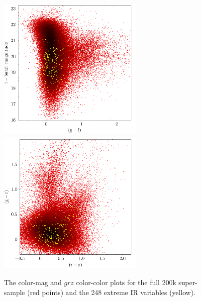 \documentclass{emulateapj}
\begin{document}
    \begin{figure}
      \includegraphics[width=7.00cm, height=7.00cm, trim=0.0cm 0.0cm 0.0cm 0.0cm, clip]
      {../color_color/colormag_gr_imag_topcat.png}
      \includegraphics[width=7.00cm, height=7.00cm, trim=0.0cm 0.0cm 0.0cm 0.0cm, clip]
      {../color_color/colormag_grz_topcat.png}
      \centering
      \caption[]{The color-mag and $grz$ color-color plots for the full 200k super-sample (red points) 
        and the 248 extreme IR variables (yellow).}
      \label{fig:grz_colorcolor}
    \end{figure}


    
\end{document}
